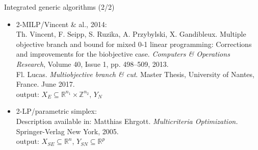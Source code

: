 \documentclass[10pt,xcolor=dvipsnames]{beamer}
\newcommand{\mR}{\mathbb{R}}
\newcommand{\mZ}{\mathbb{Z}}
\newcommand{\grey}{\textcolor{black!25}}
\newcommand{\R}{\mathbb{R}}%
\newcommand{\Z}{\mathbb{Z}}
\begin{document}
%
% 
\begin{frame}{Integrated generic algorithms (2/2)}

{\small
\begin{itemize}
%     
\item \grey{
         2-MILP/Vincent \& al., 2014:\vspace{1mm}\\   
         {\tiny  Th. Vincent, F. Seipp, S. Ruzika, A. Przybylski, X. Gandibleux.
          Multiple objective branch and bound for mixed 0-1 linear programming: Corrections and improvements for the biobjective case. 
          \textit{Computers \& Operations Research}, Volume 40, Issue 1, pp. 498--509, 2013.\smallskip\\
          Fl. Lucas. \textit{Multiobjective branch \& cut}. Master Thesis, University of Nantes, France. June 2017.\\
          }
         output: $X_E \subseteq \mR^{n_1} \times \mZ^{n_2}$, $Y_N $
         }         
         \medskip
         
\item \grey{
         2-LP/parametric simplex:\vspace{1mm}\\   
         {\tiny Description available in: Matthias Ehrgott. \textit{Multicriteria Optimization.} Springer-Verlag New York, 2005.\\}
         output: $X_{SE} \subseteq \R^n$, $Y_{SN} \subseteq \R^p$
         }         
\end{itemize}
}
\end{frame}
\end{document}
